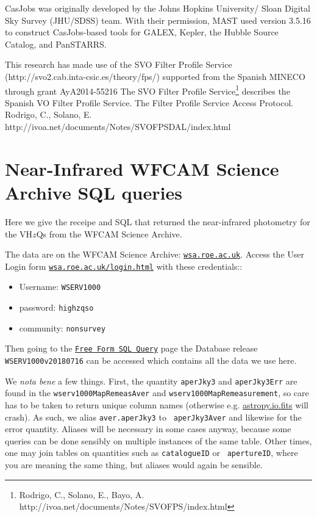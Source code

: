 \documentclass[usenatbib]{mnras}
\begin{document}
CasJobs was originally developed by the Johns Hopkins University/
Sloan Digital Sky Survey (JHU/SDSS) team. With their permission, MAST
used version 3.5.16 to construct CasJobs-based tools for GALEX,
Kepler, the Hubble Source Catalog, and PanSTARRS.

This research has made use of the SVO Filter Profile Service
(http://svo2.cab.inta-csic.es/theory/fps/) supported from the Spanish
MINECO through grant AyA2014-55216 
The SVO Filter Profile Service\footnote{Rodrigo, C., Solano, E., Bayo, A. http://ivoa.net/documents/Notes/SVOFPS/index.html}
describes the Spanish VO Filter Profile Service. 
The Filter Profile Service Access Protocol. Rodrigo, C., Solano, E. http://ivoa.net/documents/Notes/SVOFPSDAL/index.html



\appendix


\section{Near-Infrared WFCAM Science Archive SQL queries}\label{sec:SQL}
Here we give the receipe and SQL that returned the near-infrared photometry 
for the VH$z$Qs from the  WFCAM Science Archive. 

The data are on the WFCAM Science Archive: \href{wsa.roe.ac.uk}{\tt wsa.roe.ac.uk}. 
Access the User Login form \href{WFCAM Science Archive}{\tt wsa.roe.ac.uk/login.html} 
with these credentials::
\begin{itemize}
    \item Username: {\tt WSERV1000} 
    \item password: {\tt highzqso} 
    \item community: {\tt nonsurvey}
\end{itemize}
Then going to the
\href{http://wsa.roe.ac.uk:8080/wsa/SQL_form.jsp}{{\tt Free Form SQL
Query}} page the Database release {\tt WSERV1000v20180716} can be
accessed which contains all the data we use here.

We {\it nota bene} a few things. First, the quantity {\tt aperJky3}
and {\tt aperJky3Err} are found in the {\tt wserv1000MapRemeasAver}
and {\tt wserv1000MapRemeasurement}, so care has to be taken to return
unique column names (otherwise e.g.
\href{http://docs.astropy.org/en/stable/io/fits/}{astropy.io.fits}
will crash).  As such, we alias {\tt aver.aperJky3} to {\tt
aperJky3Aver} and likewise for the error quantity. Aliases will be
necessary in some cases anyway, because some queries can be done
sensibly on multiple instances of the same table. Other times, one may
join tables on quantities such as {\tt catalogueID} or {\tt
apertureID}, where you are meaning the same thing, but aliases would
again be sensible.
\end{document}
